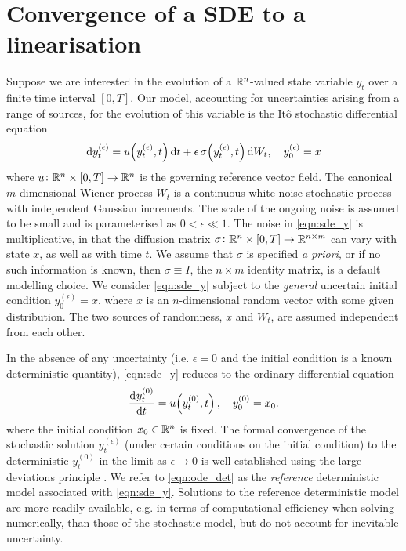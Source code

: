 \section{Convergence of a SDE to a linearisation}\label{sec:theory}
Suppose we are interested in the evolution of a \(\mathbb{R}^n\)-valued state variable \(y_t\) over a finite time interval \([0,T]\).
Our model, accounting for uncertainties arising from a range of sources, for the evolution of this variable is the It\^o stochastic differential equation
\begin{equation}
	\dif y_t^{(\epsilon)} = u\!\left(y_t^{(\epsilon)}, t\right)\dif t + \epsilon \, \sigma\!\left(y_t^{(\epsilon)}, t\right)\dif W_t, \quad y_0^{(\epsilon)} = x
	\label{eqn:sde_y}
\end{equation}
where \(u\colon \mathbb{R}^n \times [0,T] \to \mathbb{R}^n\) is the governing reference vector field.
The canonical \(m\)-dimensional Wiener process \(W_t\)  is a continuous white-noise stochastic process with independent Gaussian increments.
The scale of the ongoing noise is assumed to be small and is parameterised as \(0 < \epsilon \ll 1\).
The noise in \cref{eqn:sde_y} is multiplicative, in that the diffusion matrix \(\sigma\colon \mathbb{R}^n \times [0,T] \to \mathbb{R}^{n\times m}\) can vary with state \( x \), as well as with time \( t \).
We assume that \(\sigma\) is specified \textit{a priori}, or if no such information is known, then \(\sigma \equiv I\), the \(n \times m\) identity matrix, is a default modelling choice.
We consider \cref{eqn:sde_y} subject to the \emph{general} uncertain initial condition \(y_0^{(\epsilon)} = x\), where \(x\) is an \(n\)-dimensional random vector with some given distribution. The two sources of randomness, $ x $ and $ W_t $, are assumed independent from each other.

In the absence of any uncertainty (i.e. \(\epsilon = 0\) and the initial condition is a known deterministic quantity), \cref{eqn:sde_y} reduces to the ordinary differential equation
\begin{equation}
	\dod{y_t^{(0)}}{t} = u\!\left(y_t^{(0)}, t\right), \quad y_0^{(0)} = x_0.
	\label{eqn:ode_det}
\end{equation}
where the initial condition \(x_0 \in \mathbb{R}^n\) is fixed.
The formal convergence of the stochastic solution \(y_t^{(\epsilon)}\) (under certain conditions on the initial condition) to the deterministic \(y_{t}^{(0)}\) in the limit as \(\epsilon \to 0\) is well-established using the large deviations principle \citep[e.g]{FreidlinWentzell_1998_RandomPerturbationsDynamical}.
We refer to \cref{eqn:ode_det} as the \emph{reference} deterministic model associated with \cref{eqn:sde_y}.
Solutions to the reference deterministic model are more readily available, e.g. in terms of computational efficiency when solving numerically, than those of the stochastic model, but do not account for inevitable uncertainty.

